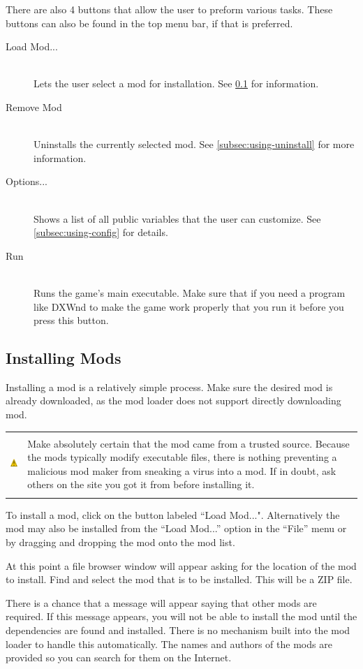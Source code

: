 \documentclass[12pt,a4paper,notitlepage]{article}
\newcommand{\warning}[1]{
    \begin{tabular}{m{1.1cm}  m{11cm}}
    &\\
    \includegraphics[width=1.1cm, height=1.1cm]{warning} & #1
    \\&\\
    \end{tabular}
}
\begin{document}
There are also 4 buttons that allow the user to preform various tasks. These buttons can also be found in the top menu bar, if that is preferred.

\begin{description}
\item[Load Mod...] \hfill \\ 
    Lets the user select a mod for installation. See \ref{subsec:using-install} for information.
\item[Remove Mod] \hfill \\
    Uninstalls the currently selected mod. See \ref{subsec:using-uninstall} for more information.
\item[Options...] \hfill \\
    Shows a list of all public variables that the user can customize. See \ref{subsec:using-config} for details.
\item[Run] \hfill \\
    Runs the game's main executable. Make sure that if you need a program like DXWnd to make the game work properly that you run it before you press this button.

\end{description}


\subsection{Installing Mods}
\label{subsec:using-install}
Installing a mod is a relatively simple process. Make sure the desired mod is already downloaded, as the mod loader does not support directly downloading mod.

\warning{Make absolutely certain that the mod came from a trusted source. Because the mods typically modify executable files, there is nothing preventing a malicious mod maker from sneaking a virus into a mod. If in doubt, ask others on the site you got it from before installing it.}

To install a mod, click on the button labeled ``Load Mod...". Alternatively the mod may also be installed from the ``Load Mod...'' option in the ``File'' menu or by dragging and dropping the mod onto the mod list.

At this point a file browser window will appear asking for the location of the mod to install. Find and select the mod that is to be installed. This will be a ZIP file.

There is a chance that a message will appear saying that other mods are required. If this message appears, you will not be able to install the mod until the dependencies are found and installed. There is no mechanism built into the mod loader to handle this automatically. The names and authors of the mods are provided so you can search for them on the Internet.
\end{document}

